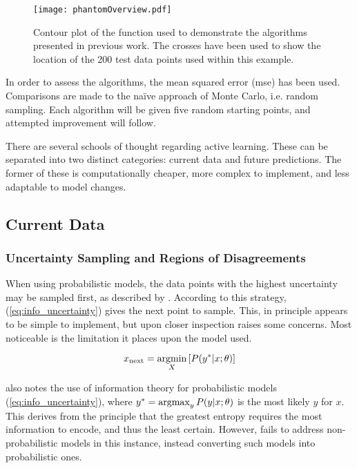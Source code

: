 \begin{figure}[h]
    \begin{center}
        \texttt{[image: phantomOverview.pdf]}
        \caption[Toy Dataset]{Contour plot of the function used to demonstrate the algorithms presented in previous work. The crosses have been used to show the location of the 200 test data points used within this example.}
        \label{fig:phantom}
    \end{center}
\end{figure}

In order to assess the algorithms, the mean squared error (mse) has been used. Comparisons are made to the na\"ive approach of Monte Carlo, i.e. random sampling. Each algorithm will be given five random starting points, and attempted improvement will follow.

There are several schools of thought regarding active learning. These can be separated into two distinct categories: current data and future predictions. The former of these is computationally cheaper, more complex to implement, and less adaptable to model changes.

\subsection{Current Data}
\subsubsection{Uncertainty Sampling and Regions of Disagreements}
\label{sec:UncertaintySampling}

When using probabilistic models, the data points with the highest uncertainty may be sampled first, as described by \textcite{Set09}. According to this strategy, (\ref{eq:info_uncertainty}) gives the next point to sample. This, in principle appears to be simple to implement, but upon closer inspection raises some concerns. Most noticeable is the limitation it places upon the model used.

\begin{equation}
    \label{eq:info_uncertainty}
    {x_\mathrm{next}=\operatorname*{argmin}_X{\left[P(y^{*}|x;\theta{})\right]}}
\end{equation}

\textcite{Set09} also notes the use of information theory for probabilistic models (\ref{eq:info_uncertainty}), where \mbox{${y^{*}=\operatorname*{argmax}_y{}P(y|x;\theta{})}$} is the most likely $y$ for $x$. This derives from the principle that the greatest entropy requires the most information to encode, and thus the least certain. However, \textcite{Set09} fails to address non-probabilistic models in this instance, instead converting such models into probabilistic ones.

